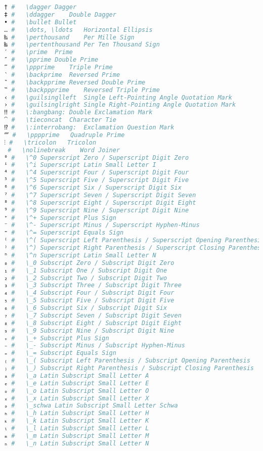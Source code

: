 \begin{lstlisting}[language=Julia, linewidth=\textwidth]
† #   \dagger Dagger
‡ #   \ddagger    Double Dagger
• #   \bullet Bullet
… #   \dots, \ldots   Horizontal Ellipsis
‰ #   \perthousand    Per Mille Sign
‱ #   \pertenthousand Per Ten Thousand Sign
′ #   \prime  Prime
″ #   \pprime Double Prime
‴ #   \ppprime    Triple Prime
‵ #   \backprime  Reversed Prime
‶ #   \backpprime Reversed Double Prime
‷ #   \backppprime    Reversed Triple Prime
‹ #   \guilsinglleft  Single Left-Pointing Angle Quotation Mark
› #   \guilsinglright Single Right-Pointing Angle Quotation Mark
‼ #   \:bangbang: Double Exclamation Mark
⁀ #   \tieconcat  Character Tie
⁉ #   \:interrobang:  Exclamation Question Mark
⁗ #   \pppprime   Quadruple Prime
⁝ #   \tricolon   Tricolon
⁠ #   \nolinebreak    Word Joiner
⁰ #   \^0 Superscript Zero / Superscript Digit Zero
ⁱ #   \^i Superscript Latin Small Letter I
⁴ #   \^4 Superscript Four / Superscript Digit Four
⁵ #   \^5 Superscript Five / Superscript Digit Five
⁶ #   \^6 Superscript Six / Superscript Digit Six
⁷ #   \^7 Superscript Seven / Superscript Digit Seven
⁸ #   \^8 Superscript Eight / Superscript Digit Eight
⁹ #   \^9 Superscript Nine / Superscript Digit Nine
⁺ #   \^+ Superscript Plus Sign
⁻ #   \^- Superscript Minus / Superscript Hyphen-Minus
⁼ #   \^= Superscript Equals Sign
⁽ #   \^( Superscript Left Parenthesis / Superscript Opening Parenthesis
⁾ #   \^) Superscript Right Parenthesis / Superscript Closing Parenthesis
ⁿ #   \^n Superscript Latin Small Letter N
₀ #   \_0 Subscript Zero / Subscript Digit Zero
₁ #   \_1 Subscript One / Subscript Digit One
₂ #   \_2 Subscript Two / Subscript Digit Two
₃ #   \_3 Subscript Three / Subscript Digit Three
₄ #   \_4 Subscript Four / Subscript Digit Four
₅ #   \_5 Subscript Five / Subscript Digit Five
₆ #   \_6 Subscript Six / Subscript Digit Six
₇ #   \_7 Subscript Seven / Subscript Digit Seven
₈ #   \_8 Subscript Eight / Subscript Digit Eight
₉ #   \_9 Subscript Nine / Subscript Digit Nine
₊ #   \_+ Subscript Plus Sign
₋ #   \_- Subscript Minus / Subscript Hyphen-Minus
₌ #   \_= Subscript Equals Sign
₍ #   \_( Subscript Left Parenthesis / Subscript Opening Parenthesis
₎ #   \_) Subscript Right Parenthesis / Subscript Closing Parenthesis
ₐ #   \_a Latin Subscript Small Letter A
ₑ #   \_e Latin Subscript Small Letter E
ₒ #   \_o Latin Subscript Small Letter O
ₓ #   \_x Latin Subscript Small Letter X
ₔ #   \_schwa Latin Subscript Small Letter Schwa
ₕ #   \_h Latin Subscript Small Letter H
ₖ #   \_k Latin Subscript Small Letter K
ₗ #   \_l Latin Subscript Small Letter L
ₘ #   \_m Latin Subscript Small Letter M
ₙ #   \_n Latin Subscript Small Letter N

\end{lstlisting}
